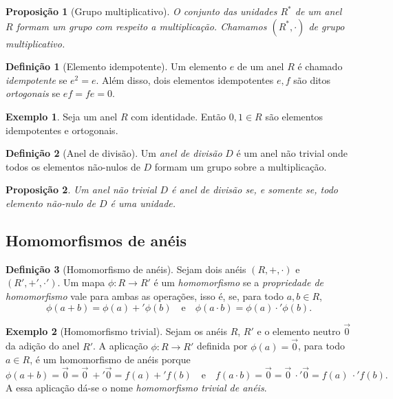 \documentclass[a4paper,12pt]{report}
\theoremstyle{plain}
\newtheorem{proposicao}{Proposição}[section]
\theoremstyle{definition}
\newtheorem{definicao}{Definição}[section]
\newtheorem{exemplo}{Exemplo}[section]
\begin{document}
\begin{proposicao}[Grupo multiplicativo]
	O conjunto das unidades $R^*$ de um anel $R$ formam um grupo com respeito a multiplicação. Chamamos $(R^*,\cdot)$ de \emph{grupo multiplicativo}.
\end{proposicao}

\begin{definicao}[Elemento idempotente]
	Um elemento $e$ de um anel $R$ é chamado \emph{idempotente} se $e^2 = e$. Além disso, dois elementos idempotentes $e,f$ são ditos \emph{ortogonais} se $ef = fe = 0$.
\end{definicao}

\begin{exemplo}
	Seja um anel $R$ com identidade. Então $0,1 \in R$ são elementos idempotentes e ortogonais.
\end{exemplo}

\begin{definicao}[Anel de divisão]
	Um \emph{anel de divisão} $D$ é um anel não trivial onde todos os elementos não-nulos de $D$ formam um grupo sobre a multiplicação. 
\end{definicao}

\begin{proposicao}
	Um anel não trivial $D$ é anel de divisão se, e somente se, todo elemento não-nulo de $D$ é uma unidade.	
\end{proposicao}

\subsection{Homomorfismos de anéis}

\begin{definicao}[Homomorfismo de anéis]
	Sejam dois anéis $(R, +, \cdot)$ e $(R', +', \cdot')$. Um mapa $\phi: R \longrightarrow R'$ é um \emph{homomorfismo} se a \emph{propriedade de homomorfismo} vale para ambas as operações, isso é, se, para todo $a,b\in R$,
	$$\phi(a+b) = \phi(a) +' \phi(b) \quad \text{e} \quad \phi(a\cdot b) = \phi(a) \cdot' \phi(b).$$
\end{definicao}

\begin{exemplo}[Homomorfismo trivial]
	Sejam os anéis $R$, $R'$ e o elemento neutro $\vec 0$ da adição do anel $R'$. A aplicação $\phi: R\longrightarrow R'$ definida por $\phi(a) = \vec 0$, para todo $a\in R$, é um homomorfismo de anéis porque $$\phi(a + b) = \vec 0 = \vec 0 \ +' \vec 0 = f(a) +' f(b) \quad \text{e} \quad f(a\cdot b) = \vec 0 = \vec 0 \ \cdot' \vec 0 = f(a)\ \cdot' f(b).$$
	A essa aplicação dá-se o nome \emph{homomorfismo trivial de anéis}.
\end{exemplo}
\end{document}
